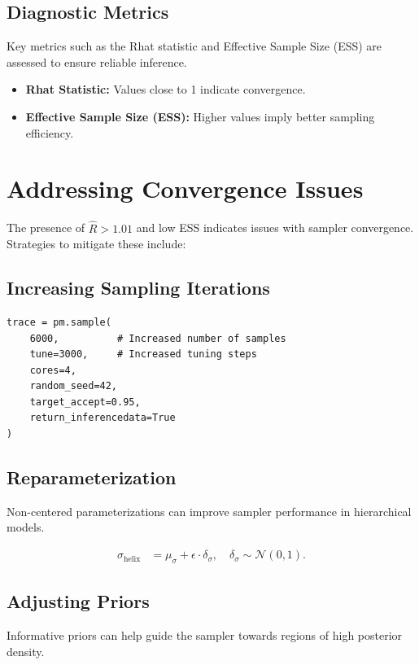 \documentclass[12pt]{article}
\begin{document}
\subsection{Diagnostic Metrics}
Key metrics such as the Rhat statistic and Effective Sample Size (ESS) are assessed to ensure reliable inference.

\begin{itemize}
    \item \textbf{Rhat Statistic:} Values close to 1 indicate convergence.
    \item \textbf{Effective Sample Size (ESS):} Higher values imply better sampling efficiency.
\end{itemize}

\section{Addressing Convergence Issues}

The presence of \( \hat{R} > 1.01 \) and low ESS indicates issues with sampler convergence. Strategies to mitigate these include:

\subsection{Increasing Sampling Iterations}
\begin{verbatim}
trace = pm.sample(
    6000,          # Increased number of samples
    tune=3000,     # Increased tuning steps
    cores=4,
    random_seed=42,
    target_accept=0.95,
    return_inferencedata=True
)
\end{verbatim}

\subsection{Reparameterization}
Non-centered parameterizations can improve sampler performance in hierarchical models.

\begin{align}
    \sigma_{\text{helix}} &= \mu_{\sigma} + \epsilon \cdot \delta_{\sigma}, \quad \delta_{\sigma} \sim \mathcal{N}(0, 1).
\end{align}

\subsection{Adjusting Priors}
Informative priors can help guide the sampler towards regions of high posterior density.
\end{document}
